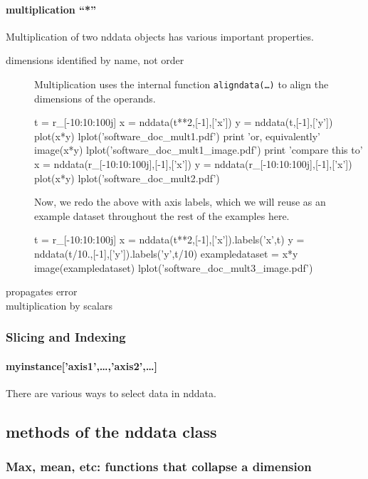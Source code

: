 \paragraph{multiplication ``*''}
Multiplication of two nddata objects has various important properties.
\begin{description}
\item[dimensions identified by name, not order]
Multiplication uses the internal function \texttt{aligndata(\ldots)} \label{codelabel:aligndata}
    to align the dimensions of the operands.

\begin{python}
t = r_[-10:10:100j]
x = nddata(t**2,[-1],['x'])
y = nddata(t,[-1],['y'])
plot(x*y)
lplot('software_doc_mult1.pdf')
print 'or, equivalently'
image(x*y)
lplot('software_doc_mult1_image.pdf')
print 'compare this to'
x = nddata(r_[-10:10:100j],[-1],['x'])
y = nddata(r_[-10:10:100j],[-1],['x'])
plot(x*y)
lplot('software_doc_mult2.pdf')
\end{python}

Now, we redo the above with axis labels,
    which we will reuse as an example dataset
    throughout the rest of the examples here.

\begin{python}
t = r_[-10:10:100j]
x = nddata(t**2,[-1],['x']).labels('x',t)
y = nddata(t/10.,[-1],['y']).labels('y',t/10)
exampledataset = x*y
image(exampledataset)
lplot('software_doc_mult3_image.pdf')
\end{python}
\item[propagates error]
\nts{\ldots}
\item[multiplication by scalars]
\nts{\ldots}
\end{description}
\subsubsection{Slicing and Indexing}
\paragraph{myinstance['axis1',\ldots,'axis2',\ldots]}
There are various ways to select data in nddata.

\subsection{methods of the nddata class}
\subsubsection{Max, mean, etc: functions that collapse a dimension}
